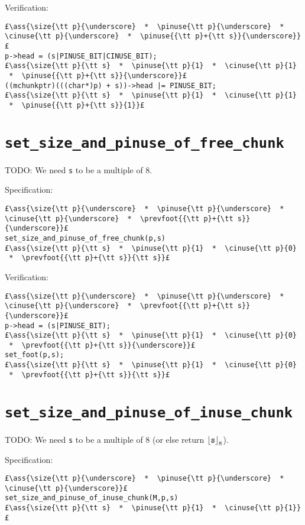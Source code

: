 \documentclass[svgnames,10pt,twoside]{report}
\makeatletter
\newcommand{\ml}[2][t]{\mbox{\mdseries\begin{tabular}[#1]{@{}L@{}}#2\end{tabular}}}
\newcommand{\ass}[1]{\ensuremath{{\color{blue}\left\{\ml[c]{#1}\right\}}}}
\renewcommand{\floor}[2][]{\left\lfloor{#2}\right\rfloor_{#1}}
\makeatother
\begin{document}
\noindent Verification:
\begin{lstlisting}
£\ass{\size{\tt p}{\underscore}  *  \pinuse{\tt p}{\underscore}  *  \cinuse{\tt p}{\underscore}  *  \pinuse{{\tt p}+{\tt s}}{\underscore}}£
p->head = (s|PINUSE_BIT|CINUSE_BIT);
£\ass{\size{\tt p}{\tt s}  *  \pinuse{\tt p}{1}  *  \cinuse{\tt p}{1}  *  \pinuse{{\tt p}+{\tt s}}{\underscore}}£
((mchunkptr)(((char*)p) + s))->head |= PINUSE_BIT;
£\ass{\size{\tt p}{\tt s}  *  \pinuse{\tt p}{1}  *  \cinuse{\tt p}{1}  *  \pinuse{{\tt p}+{\tt s}}{1}}£
\end{lstlisting}

\section{\tt set\_size\_and\_pinuse\_of\_free\_chunk}

TODO: We need {\tt s} to be a multiple of 8.

Specification:
\begin{lstlisting}
£\ass{\size{\tt p}{\underscore}  *  \pinuse{\tt p}{\underscore}  *  \cinuse{\tt p}{\underscore}  *  \prevfoot{{\tt p}+{\tt s}}{\underscore}}£
set_size_and_pinuse_of_free_chunk(p,s)
£\ass{\size{\tt p}{\tt s}  *  \pinuse{\tt p}{1}  *  \cinuse{\tt p}{0}  *  \prevfoot{{\tt p}+{\tt s}}{\tt s}}£
\end{lstlisting}

\noindent Verification:
\begin{lstlisting}
£\ass{\size{\tt p}{\underscore}  *  \pinuse{\tt p}{\underscore}  *  \cinuse{\tt p}{\underscore}  *  \prevfoot{{\tt p}+{\tt s}}{\underscore}}£
p->head = (s|PINUSE_BIT);
£\ass{\size{\tt p}{\tt s}  *  \pinuse{\tt p}{1}  *  \cinuse{\tt p}{0}  *  \prevfoot{{\tt p}+{\tt s}}{\underscore}}£
set_foot(p,s);
£\ass{\size{\tt p}{\tt s}  *  \pinuse{\tt p}{1}  *  \cinuse{\tt p}{0}  *  \prevfoot{{\tt p}+{\tt s}}{\tt s}}£
\end{lstlisting}

\section{\tt set\_size\_and\_pinuse\_of\_inuse\_chunk}

TODO: We need {\tt s} to be a multiple of 8 (or else return $\floor[8]{{\tt s}}$).

Specification:
\begin{lstlisting}
£\ass{\size{\tt p}{\underscore}  *  \pinuse{\tt p}{\underscore}  *  \cinuse{\tt p}{\underscore}}£
set_size_and_pinuse_of_inuse_chunk(M,p,s)
£\ass{\size{\tt p}{\tt s}  *  \pinuse{\tt p}{1}  *  \cinuse{\tt p}{1}}£
\end{lstlisting}
\end{document}
